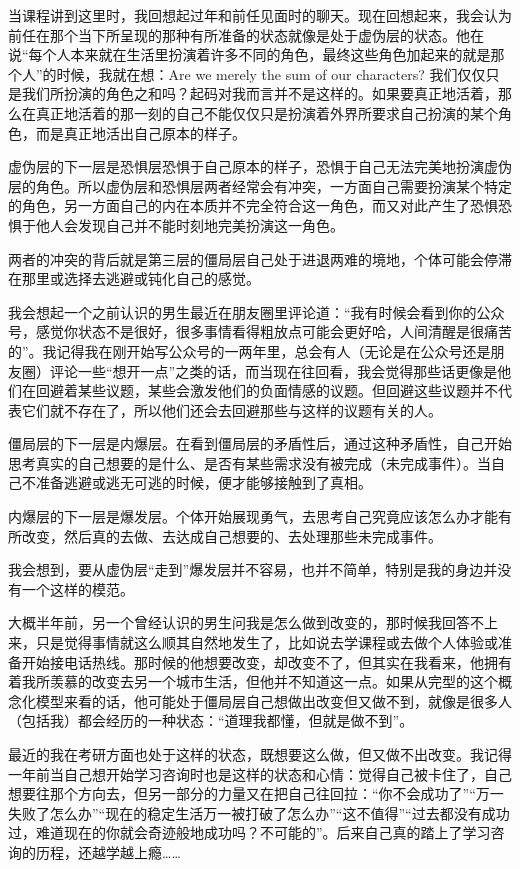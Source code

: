 当课程讲到这里时，我回想起过年和前任见面时的聊天。现在回想起来，我会认为前任在那个当下所呈现的那种有所准备的状态就像是处于虚伪层的状态。他在说“每个人本来就在生活里扮演着许多不同的角色，最终这些角色加起来的就是那个人”的时候，我就在想：Are we merely the sum of our characters? 我们仅仅只是我们所扮演的角色之和吗？起码对我而言并不是这样的。如果要真正地活着，那么在真正地活着的那一刻的自己不能仅仅只是扮演着外界所要求自己扮演的某个角色，而是真正地活出自己原本的样子。

虚伪层的下一层是恐惧层\pozhehao{}恐惧于自己原本的样子，恐惧于自己无法完美地扮演虚伪层的角色。所以虚伪层和恐惧层两者经常会有冲突，一方面自己需要扮演某个特定的角色，另一方面自己的内在本质并不完全符合这一角色，而又对此产生了恐惧\pozhehao{}恐惧于他人会发现自己并不能时刻地完美扮演这一角色。

两者的冲突的背后就是第三层的僵局层\pozhehao{}自己处于进退两难的境地，个体可能会停滞在那里或选择去逃避或钝化自己的感觉。

我会想起一个之前认识的男生最近在朋友圈里评论道：“我有时候会看到你的公众号，感觉你状态不是很好，很多事情看得粗放点可能会更好哈，人间清醒是很痛苦的”。我记得我在刚开始写公众号的一两年里，总会有人（无论是在公众号还是朋友圈）评论一些“想开一点”之类的话，而当现在往回看，我会觉得那些话更像是他们在回避着某些议题，某些会激发他们的负面情感的议题。但回避这些议题并不代表它们就不存在了，所以他们还会去回避那些与这样的议题有关的人。

僵局层的下一层是内爆层。在看到僵局层的矛盾性后，通过这种矛盾性，自己开始思考真实的自己想要的是什么、是否有某些需求没有被完成（未完成事件）。当自己不准备逃避或逃无可逃的时候，便才能够接触到了真相。

内爆层的下一层是爆发层。个体开始展现勇气，去思考自己究竟应该怎么办才能有所改变，然后真的去做、去达成自己想要的、去处理那些未完成事件。

我会想到，要从虚伪层“走到”爆发层并不容易，也并不简单，特别是我的身边并没有一个这样的模范。

大概半年前，另一个曾经认识的男生问我是怎么做到改变的，那时候我回答不上来，只是觉得事情就这么顺其自然地发生了，比如说去学课程或去做个人体验或准备开始接电话热线。那时候的他想要改变，却改变不了，但其实在我看来，他拥有着我所羡慕的改变\pozhehao{}去另一个城市生活，但他并不知道这一点。如果从完型的这个概念化模型来看的话，他可能处于僵局层\pozhehao{}自己想做出改变但又做不到，就像是很多人（包括我）都会经历的一种状态：“道理我都懂，但就是做不到”。

最近的我在考研方面也处于这样的状态，既想要这么做，但又做不出改变。我记得一年前当自己想开始学习咨询时也是这样的状态和心情：觉得自己被卡住了，自己想要往那个方向去，但另一部分的力量又在把自己往回拉：“你不会成功了”“万一失败了怎么办”“现在的稳定生活万一被打破了怎么办”“这不值得”“过去都没有成功过，难道现在的你就会奇迹般地成功吗？不可能的”。后来自己真的踏上了学习咨询的历程，还越学越上瘾……

